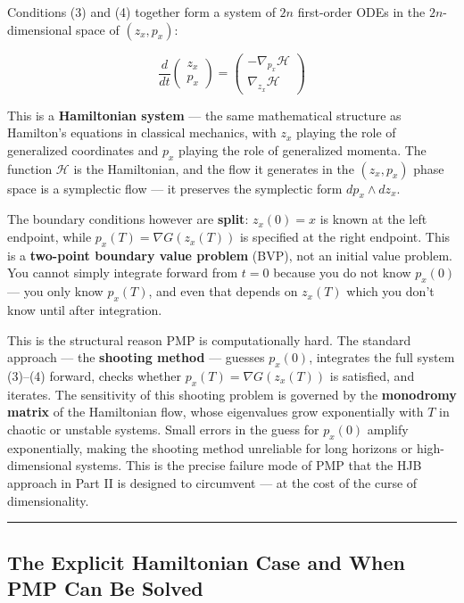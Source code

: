 \documentclass{article}
\begin{document}
\begin{physicsinsightbox}
Conditions (3) and (4) together form a system of $2n$ first-order ODEs in the $2n$-dimensional space of $(z_x, p_x)$:

$$\frac{d}{dt}\begin{pmatrix} z_x \\ p_x \end{pmatrix} = \begin{pmatrix} -\nabla_{p_x}\mathcal{H} \\ \nabla_{z_x}\mathcal{H} \end{pmatrix}$$

This is a \textbf{Hamiltonian system} — the same mathematical structure as Hamilton's equations in classical mechanics, with $z_x$ playing the role of generalized coordinates and $p_x$ playing the role of generalized momenta. The function $\mathcal{H}$ is the Hamiltonian, and the flow it generates in the $(z_x, p_x)$ phase space is a symplectic flow — it preserves the symplectic form $dp_x \wedge dz_x$.

The boundary conditions however are \textbf{split}: $z_x(0) = x$ is known at the left endpoint, while $p_x(T) = \nabla G(z_x(T))$ is specified at the right endpoint. This is a \textbf{two-point boundary value problem} (BVP), not an initial value problem. You cannot simply integrate forward from $t=0$ because you do not know $p_x(0)$ — you only know $p_x(T)$, and even that depends on $z_x(T)$ which you don't know until after integration.

This is the structural reason PMP is computationally hard. The standard approach — the \textbf{shooting method} — guesses $p_x(0)$, integrates the full system (3)–(4) forward, checks whether $p_x(T) = \nabla G(z_x(T))$ is satisfied, and iterates. The sensitivity of this shooting problem is governed by the \textbf{monodromy matrix} of the Hamiltonian flow, whose eigenvalues grow exponentially with $T$ in chaotic or unstable systems. Small errors in the guess for $p_x(0)$ amplify exponentially, making the shooting method unreliable for long horizons or high-dimensional systems. This is the precise failure mode of PMP that the HJB approach in Part II is designed to circumvent — at the cost of the curse of dimensionality.
\end{physicsinsightbox}


\medskip\hrule\medskip

\subsection{The Explicit Hamiltonian Case and When PMP Can Be Solved}
\label{sec:explicit-case}
\end{document}
